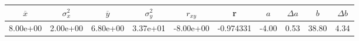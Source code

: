 \begin{tabular}{cccccccccc}
\toprule
$\overline{x}$ & $\sigma_x^2$ & $\overline{y}$ & $\sigma_y^2$ & $r_{xy}$ & r & $a$ & $\Delta a$ & $b$ & $\Delta b$ \\
\midrule
8.00e+00 & 2.00e+00 & 6.80e+00 & 3.37e+01 & -8.00e+00 & -0.974331 & -4.00 & 0.53 & 38.80 & 4.34 \\
\bottomrule
\end{tabular}
